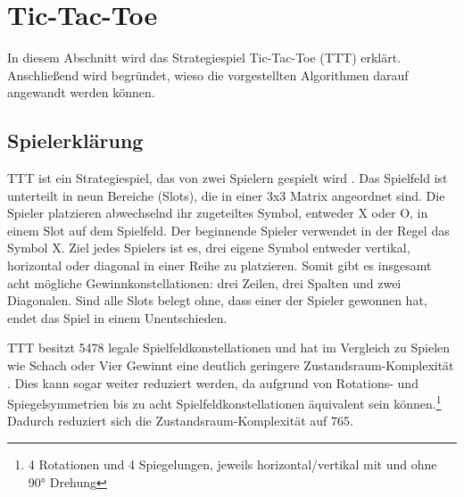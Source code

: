 \section{Tic-Tac-Toe}

In diesem Abschnitt wird das Strategiespiel Tic-Tac-Toe (\ac{TTT}) erklärt. Anschließend wird begründet, wieso die vorgestellten Algorithmen darauf angewandt werden können. 

\subsection{Spielerklärung}
\acl{TTT} ist ein Strategiespiel, das von zwei Spielern gespielt wird \cite[S. 6]{allisSearchingSolutionsGames1994}.
Das Spielfeld ist unterteilt in neun Bereiche (Slots), die in einer 3x3 Matrix angeordnet sind. 
Die Spieler platzieren abwechselnd ihr zugeteiltes Symbol, entweder X oder O, in einem Slot auf dem Spielfeld. 
Der beginnende Spieler verwendet in der Regel das Symbol X. 
Ziel jedes Spielers ist es, drei eigene Symbol entweder vertikal, horizontal oder diagonal in einer Reihe zu platzieren.
Somit gibt es insgesamt acht mögliche Gewinnkonstellationen: drei Zeilen, drei Spalten und zwei Diagonalen. 
Sind alle Slots belegt ohne, dass einer der Spieler gewonnen hat, endet das Spiel in einem Unentschieden. \cite[S. 533]{crowleyFlexibleStrategyUse1993}

\acs{TTT} besitzt 5478 legale Spielfeldkonstellationen und hat im Vergleich zu Spielen wie Schach oder Vier Gewinnt eine deutlich geringere Zustandsraum-Komplexität  \cite[S. 159]{allisSearchingSolutionsGames1994}.
Dies kann sogar weiter reduziert werden, da aufgrund von Rotations- und Spiegelsymmetrien bis zu acht Spielfeldkonstellationen äquivalent sein können.\footnote{4 Rotationen und 4 Spiegelungen, jeweils horizontal/vertikal mit und ohne 90° Drehung} 
Dadurch reduziert sich die Zustandsraum-Komplexität auf 765. \cite[S. 3]{block-berlitzm.ProInformatikFunktionaleProgrammierung2009}

